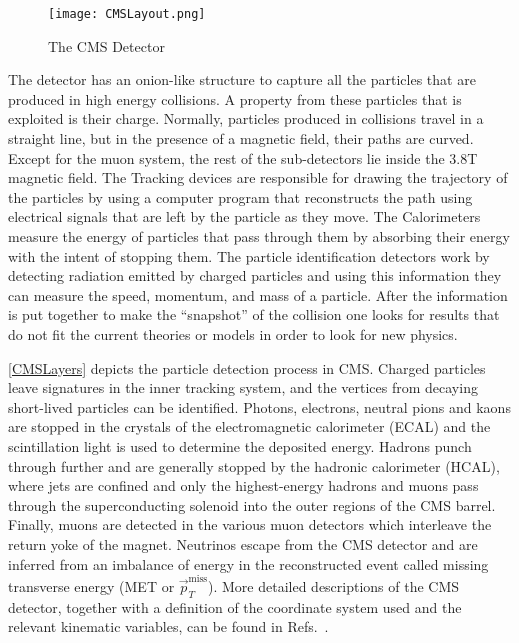 


\begin{figure}
	\centering
	\texttt{[image: CMSLayout.png]}
	\caption{The CMS Detector \label{CMSLayout}}
\end{figure}

The detector has an onion-like structure to capture all the particles that are produced in high energy collisions.
A property from these particles that is exploited is their charge. Normally, particles produced in collisions travel in a straight line, but in the presence of a magnetic field, their paths are curved.
Except for the muon system, the rest of the sub-detectors lie inside the 3.8\unit{T} magnetic field.
The Tracking devices are responsible for drawing the trajectory of the particles by using a computer program that reconstructs the path using electrical signals that are left by the particle as they move. The Calorimeters measure the energy of particles that pass through them by absorbing their energy with the intent of stopping them.
The particle identification detectors work by detecting radiation emitted by charged particles and using this information they can measure the speed, momentum, and mass of a particle. After the information is put together to make the “snapshot” of the collision one looks for results that do not fit the current theories or models in order to look for new physics.

\autoref{CMSLayers} depicts the particle detection process in CMS. Charged particles leave signatures in the inner tracking system, and the vertices from decaying short-lived particles can be identified. Photons, electrons, neutral pions and kaons are stopped in the crystals of the electromagnetic calorimeter (ECAL) and the scintillation light is used to determine the deposited energy. Hadrons punch through further and are generally stopped by the hadronic calorimeter (HCAL), where jets are confined and only the highest-energy hadrons and muons pass through the superconducting solenoid into the outer regions of the CMS barrel. Finally, muons are detected in the various muon detectors which interleave the return yoke of the magnet. Neutrinos escape from the CMS detector and are inferred from an imbalance of energy in the reconstructed event called missing transverse energy (MET or $\vec{p}_T^{\text{miss}}$).
More detailed descriptions of the CMS detector, together with a definition of the coordinate system used and the relevant kinematic variables, can be found in Refs.~\cite{CMS:2008xjf,CMS:2023gfb}.

